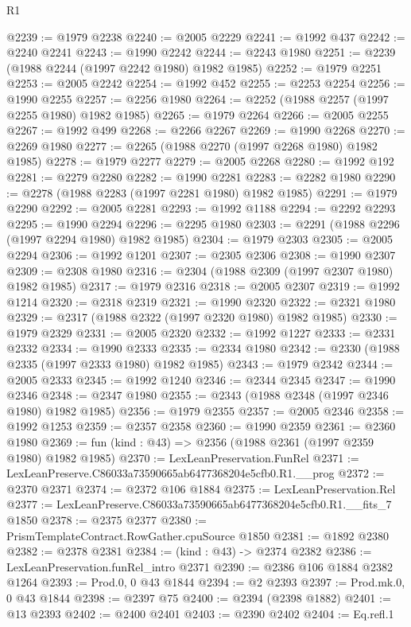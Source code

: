 \begin{lexlean}{R1}
\begin{coremodule}
@2239 := @1979 @2238
@2240 := @2005 @2229
@2241 := @1992 @437
@2242 := @2240 @2241
@2243 := @1990 @2242
@2244 := @2243 @1980
@2251 := @2239 (@1988 @2244 (@1997 @2242 @1980) @1982 @1985)
@2252 := @1979 @2251
@2253 := @2005 @2242
@2254 := @1992 @452
@2255 := @2253 @2254
@2256 := @1990 @2255
@2257 := @2256 @1980
@2264 := @2252 (@1988 @2257 (@1997 @2255 @1980) @1982 @1985)
@2265 := @1979 @2264
@2266 := @2005 @2255
@2267 := @1992 @499
@2268 := @2266 @2267
@2269 := @1990 @2268
@2270 := @2269 @1980
@2277 := @2265 (@1988 @2270 (@1997 @2268 @1980) @1982 @1985)
@2278 := @1979 @2277
@2279 := @2005 @2268
@2280 := @1992 @192
@2281 := @2279 @2280
@2282 := @1990 @2281
@2283 := @2282 @1980
@2290 := @2278 (@1988 @2283 (@1997 @2281 @1980) @1982 @1985)
@2291 := @1979 @2290
@2292 := @2005 @2281
@2293 := @1992 @1188
@2294 := @2292 @2293
@2295 := @1990 @2294
@2296 := @2295 @1980
@2303 := @2291 (@1988 @2296 (@1997 @2294 @1980) @1982 @1985)
@2304 := @1979 @2303
@2305 := @2005 @2294
@2306 := @1992 @1201
@2307 := @2305 @2306
@2308 := @1990 @2307
@2309 := @2308 @1980
@2316 := @2304 (@1988 @2309 (@1997 @2307 @1980) @1982 @1985)
@2317 := @1979 @2316
@2318 := @2005 @2307
@2319 := @1992 @1214
@2320 := @2318 @2319
@2321 := @1990 @2320
@2322 := @2321 @1980
@2329 := @2317 (@1988 @2322 (@1997 @2320 @1980) @1982 @1985)
@2330 := @1979 @2329
@2331 := @2005 @2320
@2332 := @1992 @1227
@2333 := @2331 @2332
@2334 := @1990 @2333
@2335 := @2334 @1980
@2342 := @2330 (@1988 @2335 (@1997 @2333 @1980) @1982 @1985)
@2343 := @1979 @2342
@2344 := @2005 @2333
@2345 := @1992 @1240
@2346 := @2344 @2345
@2347 := @1990 @2346
@2348 := @2347 @1980
@2355 := @2343 (@1988 @2348 (@1997 @2346 @1980) @1982 @1985)
@2356 := @1979 @2355
@2357 := @2005 @2346
@2358 := @1992 @1253
@2359 := @2357 @2358
@2360 := @1990 @2359
@2361 := @2360 @1980
@2369 := fun (kind : @43) => @2356 (@1988 @2361 (@1997 @2359 @1980) @1982 @1985)
@2370 := LexLeanPreservation.FunRel
@2371 := LexLeanPreserve.C86033a73590665ab6477368204e5cfb0.R1.__prog
@2372 := @2370 @2371
@2374 := @2372 @106 @1884
@2375 := LexLeanPreservation.Rel
@2377 := LexLeanPreserve.C86033a73590665ab6477368204e5cfb0.R1.__fits_7 @1850
@2378 := @2375 @2377
@2380 := PrismTemplateContract.RowGather.cpuSource @1850
@2381 := @1892 @2380
@2382 := @2378 @2381
@2384 := (kind : @43) -> @2374 @2382
@2386 := LexLeanPreservation.funRel_intro @2371
@2390 := @2386 @106 @1884 @2382 @1264
@2393 := Prod.{0, 0} @43 @1844
@2394 := @2 @2393
@2397 := Prod.mk.{0, 0} @43 @1844
@2398 := @2397 @75
@2400 := @2394 (@2398 @1882)
@2401 := @13 @2393
@2402 := @2400 @2401
@2403 := @2390 @2402
@2404 := Eq.refl.{1}

\end{coremodule}
\end{lexlean}
